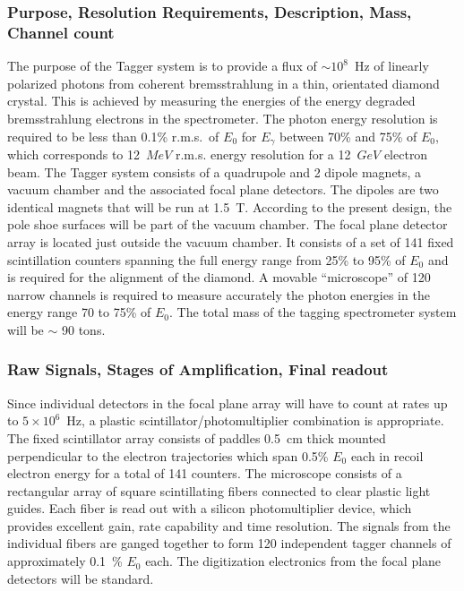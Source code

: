 \subsubsection*{Purpose, Resolution Requirements, Description, Mass, Channel count}
The purpose of the Tagger system is to provide a flux of $\sim 10^{8}$~Hz
of linearly polarized photons from coherent bremsstrahlung in a thin,
orientated diamond crystal. This is achieved by measuring the energies
of the energy degraded bremsstrahlung electrons in the spectrometer.
The photon energy resolution is required to be less than 0.1\% r.m.s.\
of $E_{0}$ for $E_{\gamma}$ between 70\% and 75\%  of $E_{0}$, which
corresponds to 12~$MeV$ r.m.s. energy resolution for a 12~$GeV$ electron beam. 
The Tagger system consists of a quadrupole and 2 dipole magnets, 
a vacuum chamber and the associated focal plane detectors. The dipoles
are two identical magnets that will be run at 1.5~T.  According to the
present design, the pole shoe surfaces will be part of the vacuum chamber.
The focal plane detector array is located just outside the vacuum chamber.
It consists of a set of 141 fixed scintillation counters spanning the full
energy range from 25\% to 95\% of $E_{0}$ and is required for the alignment
of the diamond. A movable ``microscope'' of 120 narrow channels is required
to measure accurately the photon energies in the energy  range 70 to 75\%
of $E_{0}$.  The total mass of the tagging spectrometer system will be
$\sim$ 90 tons.  

\subsubsection*{Raw Signals, Stages of Amplification, Final readout}

Since individual detectors in the focal plane array will have to count
at rates up to $5\times 10^{6}$~Hz, a plastic scintillator/photomultiplier
combination is appropriate.  The fixed scintillator array consists of
paddles 0.5~cm thick mounted perpendicular to the electron trajectories
which span 0.5\% $E_0$ each in recoil electron energy for a total of 141
counters.  The microscope consists of a rectangular array of square
scintillating fibers connected to clear plastic light guides.  Each
fiber is read out with a silicon photomultiplier device, which provides
excellent gain, rate capability and time resolution.  The signals from
the individual fibers are ganged together to form 120 independent tagger
channels of approximately 0.1~\% $E_0$ each.  The digitization electronics
from the focal plane detectors will be standard.


